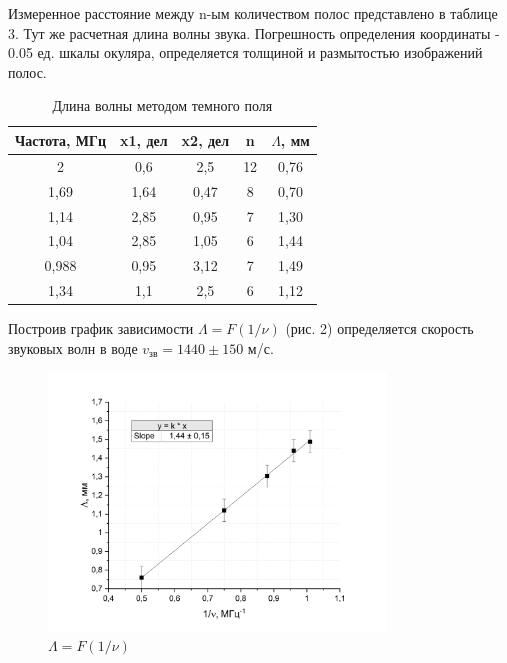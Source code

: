 \documentclass[a4paper, 12pt]{article}
\begin{document}
Измеренное расстояние между n-ым количеством полос представлено в таблице 3. Тут же расчетная длина волны звука. Погрешность определения координаты - 0.05 ед. шкалы окуляра, определяется толщиной и размытостью изображений полос.
\begin{table}[h]
\begin{center}
\caption{Длина волны методом темного поля}
\begin{tabular}{|c|c|c|c|c|}
\hline
Частота, МГц & x1, дел & x2, дел & n  & $\Lambda$, мм \\ \hline
2            & 0,6     & 2,5     & 12 & 0,76      \\ \hline
1,69         & 1,64    & 0,47    & 8  & 0,70      \\ \hline
1,14         & 2,85    & 0,95    & 7  & 1,30      \\ \hline
1,04         & 2,85    & 1,05    & 6  & 1,44      \\ \hline
0,988        & 0,95    & 3,12    & 7  & 1,49      \\ \hline
1,34         & 1,1     & 2,5     & 6  & 1,12      \\ \hline
\end{tabular}
\end{center}
\end{table}

Построив график зависимости $\Lambda=F(1/\nu)$ (рис. 2) определяется скорость звуковых волн в воде $v_{\text{зв}} = 1440 \pm 150$ м/с.

\begin{figure}[h!]
    \begin{center}
    \includegraphics[width=0.8\textwidth]{v.png}
    \end{center}
    \caption{$\Lambda=F(1/\nu)$}
\end{figure}
\end{document}
